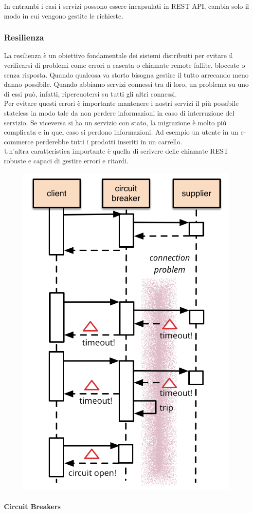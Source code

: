 \documentclass{article}
\begin{document}
		In entrambi i casi i servizi possono essere incapsulati in REST API, cambia solo il modo in cui vengono gestite le richieste.

		\subsubsection{Resilienza}
		La resilienza è un obiettivo fondamentale dei sistemi distribuiti per evitare il verificarsi di problemi come errori a cascata o chiamate remote fallite, bloccate o senza risposta.
		Quando qualcosa va storto bisogna gestire il tutto arrecando meno danno possibile. Quando abbiamo servizi connessi tra di loro, un problema su uno di essi può, infatti, ripercuotersi su tutti gli altri connessi.\\
		
		Per evitare questi errori è importante mantenere i nostri servizi il più possibile stateless in modo tale da non perdere informazioni in caso di interruzione del servizio.
		Se viceversa si ha un servizio con stato, la migrazione è molto più complicata e in quel caso si perdono informazioni. Ad esempio un utente in un e-commerce perderebbe tutti i prodotti inseriti in un carrello.\\
		
		Un'altra caratteristica importante è quella di scrivere delle chiamate REST robuste e capaci di gestire errori e ritardi.\\
		
		\begin{figure}
			\centering
			\includegraphics[width=0.4\linewidth]{SAC_A3_breakers}
			\label{fig:saca3breakers}
		\end{figure}
		\paragraph{Circuit Breakers}
		
\end{document}
